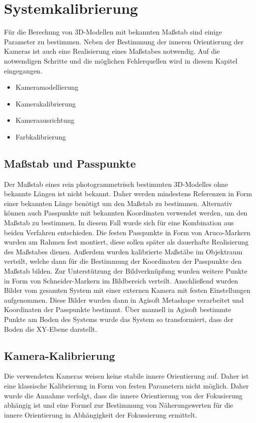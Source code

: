 \documentclass[./00PhotoBox.tex]{subfiles}
\begin{document}
\chapter{Systemkalibrierung}

Für die Berechung von 3D-Modellen mit bekannten Maßstab sind einige Parameter zu bestimmen. Neben der Bestimmung der inneren Orientierung der Kameras ist auch eine Realisierung eines Maßstabes notwendig. Auf die notwendigen Schritte und die möglichen Fehlerquellen wird in diesem Kapitel eingegangen.

\begin{itemize}
    \item Kameramodellierung
    \item Kamerakalibrierung
    \item Kameraausrichtung
    \item Farbkalibrierung
\end{itemize}

\section{Maßstab und Passpunkte}
\label{sec:passpunkte}
Der Maßstab eines rein photogrammetrisch bestimmten 3D-Modelles ohne bekannte Längen ist nicht bekannt. Daher werden mindestens Referenzen in Form einer bekannten Länge benötigt um den Maßstab zu bestimmen. Alternativ können auch Passpunkte mit bekannten Koordinaten verwendet werden, um den Maßstab zu bestimmen. In diesem Fall wurde sich für eine Kombination aus beiden Verfahren entschieden. Die festen Passpunkte in Form von Aruco-Markern wurden am Rahmen fest montiert, diese sollen später als dauerhafte Realisierung des Maßstabes dienen. Außerdem wurden kalibrierte Maßstäbe im Objektraum verteilt, welche dann für die Bestimmung der Koordinaten der Passpunkte den Maßstab bilden. Zur Unterstützung der Bildverknüpfung wurden weitere Punkte in Form von Schneider-Markern im Bildbereich verteilt. Anschließend wurden Bilder vom gesamten System mit  einer externen Kamera mit festen Einstellungen aufgenommen. Diese Bilder wurden dann in Agisoft Metashape verarbeitet und Koordinaten der Passpunkte bestimmt. Über manuell in Agisoft bestimmte Punkte am Boden des Systems wurde das System so transformiert, dass der Boden die XY-Ebene darstellt.

\section{Kamera-Kalibrierung}
Die verwendeten Kameras weisen keine stabile innere Orientierung auf. Daher ist eine klassische Kalibrierung in Form von festen Parametern nicht möglich. Daher wurde die Annahme verfolgt, dass die innere Orientierung von der Fokusierung abhängig ist und eine Formel zur Bestimmung von Näherungswerten für die innere Orientierung in Abhängigkeit der Fokussierung ermittelt.
\end{document}
